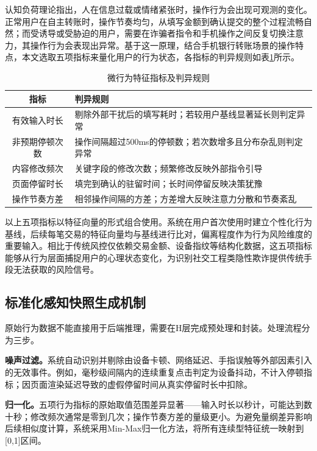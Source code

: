 \documentclass{xduugthesis}
\begin{document}
认知负荷理论指出，人在信息过载或情绪紧张时，操作行为会出现可观测的变化。正常用户在自主转账时，操作节奏均匀，从填写金额到确认提交的整个过程流畅自然；而受诱导或受胁迫的用户，需要在诈骗者指令和手机操作之间反复切换注意力，其操作行为会表现出异常。基于这一原理，结合手机银行转账场景的操作特点，本文选取五项指标来量化用户的行为状态，各指标的判异规则如表\ref{tab:micro-behavior}所示。

\begin{table}[H]
    \centering
    \caption{微行为特征指标及判异规则}
    \label{tab:micro-behavior}
    \begin{tabular}{|c|p{8cm}|}
        \hline
        指标 & 判异规则 \\
        \hline
        有效输入时长 & 剔除外部干扰后的填写耗时；若较用户基线显著延长则判定异常 \\
        \hline
        非预期停顿次数 & 操作间隔超过500ms的停顿数；若次数增多且分布杂乱则判定异常 \\
        \hline
        内容修改频次 & 关键字段的修改次数；频繁修改反映外部指令引导 \\
        \hline
        页面停留时长 & 填完到确认的驻留时间；长时间停留反映决策犹豫 \\
        \hline
        操作节奏方差 & 相邻操作间隔的方差；方差增大反映注意力分散和节奏紊乱 \\
        \hline
    \end{tabular}
\end{table}

以上五项指标以特征向量的形式组合使用。系统在用户首次使用时建立个性化行为基线，后续每笔交易的特征向量均与基线进行比对，偏离程度作为行为风险维度的重要输入。相比于传统风控仅依赖交易金额、设备指纹等结构化数据，这五项指标能够从行为层面捕捉用户的心理状态变化，为识别社交工程类隐性欺诈提供传统手段无法获取的风险信号。

\subsection{标准化感知快照生成机制}

原始行为数据不能直接用于后端推理，需要在H层完成预处理和封装。处理流程分为三步。

\textbf{噪声过滤。}系统自动识别并剔除由设备卡顿、网络延迟、手指误触等外部因素引入的无效事件。例如，毫秒级间隔内的连续重复点击判定为设备抖动，不计入停顿指标；因页面渲染延迟导致的虚假停留时间从真实停留时长中扣除。

\textbf{归一化。}五项行为指标的原始取值范围差异显著——输入时长以秒计，可能达到数十秒；修改频次通常是零到几次；操作节奏方差的量级更小。为避免量纲差异影响后续相似度计算，系统采用Min-Max归一化方法，将所有连续型特征统一映射到[0,1]区间。
\end{document}
